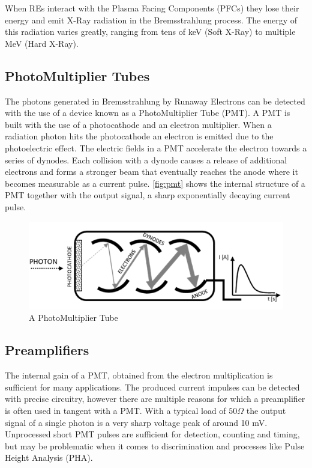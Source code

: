 When REs interact with the Plasma Facing Components (PFCs)
they lose their energy and emit X-Ray radiation in 
the Bremsstrahlung process. The energy of this radiation
varies greatly, ranging from tens of keV (Soft X-Ray)
to multiple MeV (Hard X-Ray).
\cite{hxrm_jet}

\subsection{PhotoMultiplier Tubes}

The photons generated in Bremsstrahlung by Runaway Electrons
can be detected with the use of a device known as a PhotoMultiplier Tube (PMT).
A PMT is built with the use of a photocathode and an electron multiplier.
When a radiation photon hits the photocathode an electron is emitted
due to the photoelectric effect. The electric fields in a PMT accelerate the 
electron towards a series of dynodes. Each collision with a dynode causes
a release of additional electrons and forms a stronger beam that 
eventually reaches the anode where it becomes measurable as a current pulse.
\autoref{fig:pmt} shows the internal structure of a PMT together with the output
signal, a sharp exponentially decaying current pulse.
\cite{pmts_basics, pmt_gain}
\begin{figure}[H]
  \centering
  \includegraphics[width=.7\linewidth]{media/pmt.png}
  \caption{A PhotoMultiplier Tube}
  \label{fig:pmt}
\end{figure}
\subsection{Preamplifiers}

The internal gain of a PMT, obtained from the electron multiplication
is sufficient for many applications. The produced current impulses 
can be detected with precise circuitry,
however there are multiple reasons for which
a preamplifier is often used in tangent with a PMT. With a typical
load of $50 \Omega$ the output signal of a single photon is
a very sharp voltage peak of around 10 mV.
Unprocessed short PMT pulses are sufficient for detection, counting 
and timing, but may be problematic when it comes to discrimination and 
processes like Pulse Height Analysis (PHA).
\cite{why_pmt_need_amplifiers}



